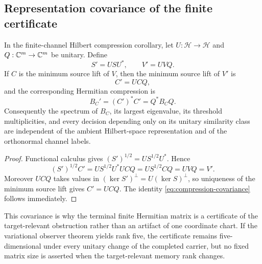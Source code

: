 \subsection{Representation covariance of the finite certificate}

\begin{corollary}
In the finite-channel Hilbert compression corollary, let $U:\mathcal H\to\mathcal H$ and $Q:\mathbb C^m\to\mathbb C^m$ be unitary. Define
\[
S'=USU^*,
\qquad
V'=UVQ.
\]
If $C$ is the minimum source lift of $V$, then the minimum source lift of $V'$ is
\[
C'=UCQ,
\]
and the corresponding Hermitian compression is
\begin{equation}
B_C'=(C')^*C'=Q^*B_CQ.
\label{eq:compression-covariance}
\end{equation}
Consequently the spectrum of $B_C$, its largest eigenvalue, its threshold multiplicities, and every decision depending only on its unitary similarity class are independent of the ambient Hilbert-space representation and of the orthonormal channel labels.
\end{corollary}

\begin{proof}
Functional calculus gives $(S')^{1/2}=US^{1/2}U^*$. Hence
\[
(S')^{1/2}C'
=US^{1/2}U^*UCQ
=US^{1/2}CQ
=UVQ
=V'.
\]
Moreover $UCQ$ takes values in $(\ker S')^\perp=U(\ker S)^\perp$, so uniqueness of the minimum source lift gives $C'=UCQ$. The identity \cref{eq:compression-covariance} follows immediately.
\end{proof}

\begin{remark}
This covariance is why the terminal finite Hermitian matrix is a certificate of the target-relevant obstruction rather than an artifact of one coordinate chart. If the variational observer theorem yields rank five, the certificate remains five-dimensional under every unitary change of the completed carrier, but no fixed matrix size is asserted when the target-relevant memory rank changes.
\end{remark}
